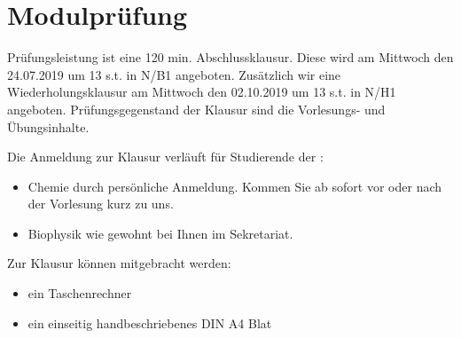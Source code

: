 \section{Modulprüfung}
Prüfungsleistung ist eine 120 min. Abschlussklausur. Diese wird am Mittwoch den 24.07.2019 um 13 s.t. in N/B1 angeboten. Zusätzlich wir eine Wiederholungsklausur am Mittwoch den 02.10.2019 um 13 s.t. in N/H1 angeboten. Prüfungsgegenstand der Klausur sind die Vorlesungs- und Übungsinhalte.

\vspace{0.5cm}

\noindent
Die Anmeldung zur Klausur verläuft für Studierende der :
\begin{itemize}
\item Chemie durch persönliche Anmeldung. Kommen Sie ab sofort vor oder nach der Vorlesung kurz zu uns.
\item Biophysik wie gewohnt bei Ihnen im Sekretariat.
\end{itemize}

\vspace{0.5cm}

\noindent
Zur Klausur können mitgebracht werden:
\begin{itemize}
\item ein Taschenrechner
\item ein einseitig handbeschriebenes DIN A4 Blat
\end{itemize}